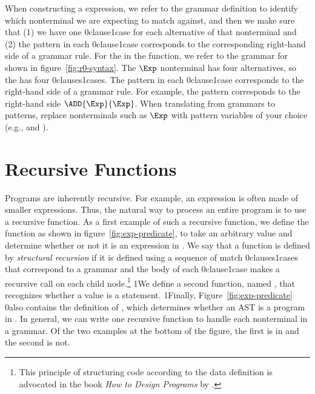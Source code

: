 \documentclass[7x10]{TimesAPriori_MIT}%
\def\racketEd{0}
\def\pythonEd{1}
\def\edition{0}
\newcommand{\racket}[1]{{\if\edition\racketEd{#1}\fi}}
\newcommand{\python}[1]{{\if\edition\pythonEd #1\fi}}
\numberwithin{theorem}{chapter}
\numberwithin{definition}{chapter}
\numberwithin{equation}{chapter}
\begin{document}
When constructing a  expression, we refer to the grammar
definition to identify which nonterminal we are expecting to match
against, and then we make sure that (1) we have one
\racket{clause}\python{case} for each alternative of that nonterminal
and (2) the pattern in each \racket{clause}\python{case}
corresponds to the corresponding right-hand side of a grammar
rule. For the  in the  function, we refer to
the grammar for \LangInt{} shown in figure~\ref{fig:r0-syntax}. The $\Exp$
nonterminal has four alternatives, so the  has four
\racket{clauses}\python{cases}.  The pattern in each
\racket{clause}\python{case} corresponds to the right-hand side of a
grammar rule. For example, the pattern 
corresponds to the right-hand side $\ADD{\Exp}{\Exp}$. When
translating from grammars to patterns, replace nonterminals such as
$\Exp$ with pattern variables of your choice (e.g.,  and
).


\section{Recursive Functions}
\label{sec:recursion}

Programs are inherently recursive. For example, an expression is often
made of smaller expressions. Thus, the natural way to process an
entire program is to use a recursive function.  As a first example of
such a recursive function, we define the function  as
shown in figure~\ref{fig:exp-predicate}, to take an arbitrary
value and determine whether or not it is an expression in \LangInt{}.
%
We say that a function is defined by \emph{structural recursion} if
it is defined using a sequence of match \racket{clauses}\python{cases}
that correspond to a grammar and the body of each
\racket{clause}\python{case} makes a recursive call on each child
node.\footnote{This principle of structuring code according to the
  data definition is advocated in the book \emph{How to Design
    Programs} by \citet{Felleisen:2001aa}.}  \python{We define a
  second function, named , that recognizes whether a value
  is a \LangInt{} statement.}  \python{Finally, }
Figure~\ref{fig:exp-predicate} \racket{also} contains the definition of
, which determines whether an AST is a program in \LangInt{}.
In general, we can write one recursive function to handle each
nonterminal in a grammar. Of the
two examples at the bottom of the figure, the first is in
\LangInt{} and the second is not.
\end{document}
